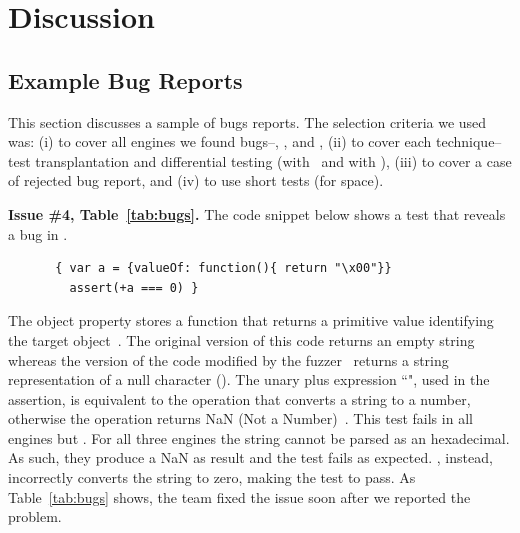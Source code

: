 \documentclass[smallextended]{svjour3}
\begin{document}
\section{Discussion}
\label{sec:bugs}


\subsection{Example Bug Reports}

This section discusses a sample of bugs reports. The selection
criteria we used was: (i) to cover all engines we found bugs--\chakra,
\jsc, and \veight, (ii) to cover each technique--test transplantation
and differential testing (with \radamsa\ and with \quickfuzz), (iii)
to cover a case of rejected bug report, and (iv) to use short tests
(for space).


\sloppy
\vspace{1ex}\noindent\textbf{Issue \#4, Table~\ref{tab:bugs}.} The
code snippet below shows a test that reveals a bug in \chakra.

\begin{figure}[h!]
  \vspace{-1ex}
  \centering
  \scriptsize
  \begin{lstlisting}
 { var a = {valueOf: function(){ return "\x00"}}
   assert(+a === 0) }
  \end{lstlisting}
  \normalsize
  \vspace{-1ex}
\end{figure}

The object property  stores a function that returns a
primitive value identifying the target object~\cite{valueof}. The
original version of this code returns an empty string whereas the
version of the code modified by the \radamsa{} fuzzer~\cite{radamsa}
returns a string representation of a null character (). The unary plus expression ``", used in the
assertion, is equivalent to the operation
 that converts a string to a number,
otherwise the operation returns NaN (Not a
Number)~\cite{unary-plus}. This test fails in all engines but
\chakra{}. For all three engines the string cannot be parsed as an
hexadecimal. As such, they produce a NaN as result and the test fails
as expected. \chakra{}, instead, incorrectly converts the string
to zero, making the test to pass. As Table~\ref{tab:bugs} shows, the
\chakra{} team fixed the issue soon after we reported the problem.
\end{document}

